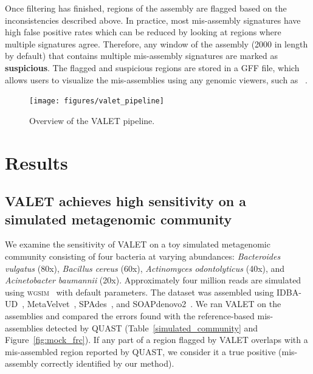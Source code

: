 \documentclass[12pt,\mydriver]{thesis}
\begin{document}
Once filtering has finished, regions of the assembly are flagged based on the inconsistencies described above.
In practice, most mis-assembly signatures have high false positive rates which can be reduced by looking at regions where multiple signatures agree.
Therefore, any window of the assembly (2000 in length by default) that contains multiple mis-assembly signatures are marked as \textbf{suspicious}.
The flagged and suspicious regions are stored in a \textsc{GFF} file, which allows users to visualize the mis-assemblies using any genomic viewers, such as ~\cite{thorvaldsdottir2012integrative}.

\begin{figure}[tb!]
\begin{center}
\texttt{[image: figures/valet\_pipeline]}
\end{center}
\renewcommand{\baselinestretch}{1}
\small\normalsize
\begin{quote}
\caption[Overview of the VALET pipeline]{Overview of the VALET pipeline.}
\label{fig:valet_pipeline}
\end{quote}
\end{figure}
\renewcommand{\baselinestretch}{2}
\small\normalsize


\section{Results}

\subsection{VALET achieves high sensitivity on a simulated metagenomic community}

We examine the sensitivity of VALET on a toy simulated metagenomic community consisting of four bacteria at varying abundances: \emph{Bacteroides vulgatus} (80x), \emph{Bacillus cereus} (60x), \emph{Actinomyces odontolyticus} (40x), and \emph{Acinetobacter baumannii} (20x).
Approximately four million reads are simulated using \textsc{wgsim}~\cite{li2013wgsim} with default parameters.
The dataset was assembled using IDBA-UD~\cite{peng2012idba}, MetaVelvet~\cite{namiki2012metavelvet}, SPAdes~\cite{bankevich2012spades}, and SOAPdenovo2~\cite{luo2012soapdenovo2}.
We ran VALET on the assemblies and compared the errors found with the reference-based mis-assemblies detected by QUAST (Table~\ref{simulated_community} and Figure~\ref{fig:mock_frc}).
If any part of a region flagged by VALET overlaps with a mis-assembled region reported by QUAST, we consider it a true positive (mis-assembly correctly identified by our method).
\end{document}
